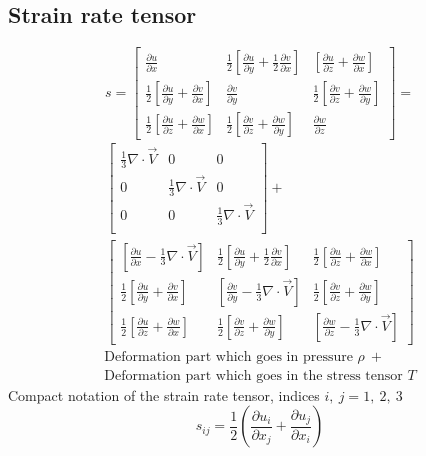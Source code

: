 \documentclass[class=report, crop=false, 12pt,a4paper]{standalone}
\begin{document}
\subsection{Strain rate tensor}
\begin{equation}
  s = \begin{bmatrix}
    \frac{\partial u}{\partial x} & \frac{1}{2} \left[ \frac{\partial u}{\partial y} + \frac{1}{2} \frac{\partial v}{\partial x} \right] & \left[ \frac{\partial u}{\partial z} + \frac{\partial w}{\partial x} \right]\\
    \frac{1}{2} \left[ \frac{\partial u}{\partial y} + \frac{\partial v}{\partial x} \right] & \frac{\partial v}{\partial y} & \frac{1}{2} \left[ \frac{\partial v}{\partial z} + \frac{\partial w}{\partial y} \right] \\
    \frac{1}{2} \left[ \frac{\partial u}{\partial z} + \frac{\partial w}{\partial x} \right] & \frac{1}{2} \left[ \frac{\partial v}{\partial z} + \frac{\partial w}{\partial y} \right] & \frac{\partial w}{\partial z}
  \end{bmatrix} =
\end{equation}
\begin{multline}
  \begin{bmatrix}
    \frac{1}{3} \nabla \cdot \vec{V} & 0 & 0\\
    0 & \frac{1}{3} \nabla \cdot \vec{V} & 0\\
    0 & 0 & \frac{1}{3} \nabla \cdot \vec{V}\\ 
  \end{bmatrix} + \\
  \begin{bmatrix}
    \left[\frac{\partial u}{\partial x} - \frac{1}{3} \nabla \cdot \vec{V} \right] & \frac{1}{2} \left[ \frac{\partial u}{\partial y} + \frac{1}{2} \frac{\partial v}{\partial x} \right] & \frac{1}{2} \left[ \frac{\partial u}{\partial z} + \frac{\partial w}{\partial x} \right]\\
    \frac{1}{2} \left[ \frac{\partial u}{\partial y} + \frac{\partial v}{\partial x} \right] & \left[ \frac{\partial v}{\partial y} - \frac{1}{3} \nabla \cdot \vec{V} \right] & \frac{1}{2} \left[ \frac{\partial v}{\partial z} + \frac{\partial w}{\partial y} \right] \\
    \frac{1}{2} \left[ \frac{\partial u}{\partial z} + \frac{\partial w}{\partial x} \right] & \frac{1}{2} \left[ \frac{\partial v}{\partial z} + \frac{\partial w}{\partial y} \right] & \left[ \frac{\partial w}{\partial z} - \frac{1}{3} \nabla \cdot \vec{V} \right]
  \end{bmatrix}
\end{multline}
\begin{multline}
  \textrm{Deformation part which goes in pressure } \rho \ +\\ \textrm{Deformation part which goes in the stress tensor } T
\end{multline}
Compact notation of the strain rate tensor, indices $i, \ j = 1, \ 2,\ 3$
\begin{equation}
  s_{ij} = \frac{1}{2} \left( \frac{\partial u_i}{\partial x_j} + \frac{\partial u_j}{\partial x_i} \right)
\end{equation}
\end{document}
